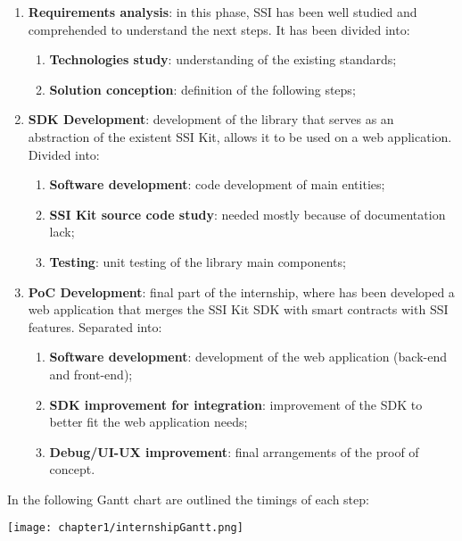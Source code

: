 \begin{enumerate}
    \item \textbf{Requirements analysis}: in this phase, SSI has been well studied 
    and comprehended to understand the next steps. It has been divided into:
    \vspace*{-0.1cm}
    \begin{enumerate}
        \setlength\itemsep{-0.1em}
        \item \textbf{Technologies study}: understanding of the existing standards;
        \item \textbf{Solution conception}: definition of the following steps;
    \end{enumerate}
    \vspace*{0.1cm}
    \item \textbf{SDK Development}: development of the library that serves as 
    an abstraction of the existent SSI Kit, allows it to be used on a web application.
    Divided into:
    \vspace*{-0.1cm}
    \begin{enumerate}
        \setlength\itemsep{-0.1em}
        \item \textbf{Software development}: code development of main entities;
        \item \textbf{SSI Kit source code study}: needed mostly because of 
        documentation lack;
        \item \textbf{Testing}: unit testing of the library main components;
    \end{enumerate}
    \vspace*{0.1cm}
    \item \textbf{PoC Development}: final part of the internship, where has been
    developed a web application that merges the SSI Kit SDK with smart contracts
    with SSI features. Separated into:
    \vspace*{-0.1cm}
    \begin{enumerate}
        \setlength\itemsep{-0.1em}
        \item \textbf{Software development}: development of the web application (back-end and
        front-end);
        \item \textbf{SDK improvement for integration}: improvement of the SDK to better 
        fit the web application needs;
        \item \textbf{Debug/UI-UX improvement}: final arrangements of the proof of concept.
    \end{enumerate}
\end{enumerate}
In the following Gantt chart are outlined the timings of each step:
\begin{center}
    \hspace*{-1cm}
    \texttt{[image: chapter1/internshipGantt.png]}
\end{center}
